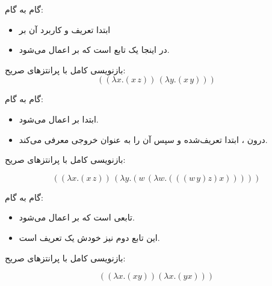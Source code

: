 \documentclass[11pt, a4paper, oneside]{article}
\newcounter{itemadded}
\let\LaTeXStandardEnumerateBegin\enumerate
\let\LaTeXStandardEnumerateEnd\endenumerate
\renewenvironment{enumerate}{%
	\LaTeXStandardEnumerateBegin%
	\setcounter{itemadded}{0}
}{%
	\LaTeXStandardEnumerateEnd%
}%
\begin{document}
		\begin{enumerate}
			
			\item {} \par
			
			گام به گام:
			
			\begin{itemize}
				
				\item ابتدا تعریف  و کاربرد آن بر 
				
				\item در اینجا  یک تابع است که بر  اعمال می‌شود.
				
			\end{itemize}
			
			بازنویسی کامل با پرانتزهای صریح:
			\[
			\left( \left( \lambda x . (x \, z) \right) \, \left( \lambda y . (x \, y) \right) \right)
			\]
			
			\item {} \par
			
			گام به گام:
			
			\begin{itemize}
				
				\item ابتدا  بر  اعمال می‌شود.
				
				\item درون ، ابتدا  تعریف‌شده و سپس  آن را به عنوان خروجی  معرفی می‌کند.
				
			\end{itemize}
			
			بازنویسی کامل با پرانتزهای صریح:
			
			\[
			\left( \left( \lambda x . (x \, z) \right) \, \left( \lambda y . \left( w \, \left( \lambda w . \left( \left( \left( w \, y \right) z \right) x \right) \right) \right) \right) \right)
			\]
			
			\item {} \par
			
			گام به گام:
			
			\begin{itemize}
				
				\item {} تابعی است که بر  اعمال می‌شود.
				
				\item این تابع دوم  نیز خودش یک تعریف \lr{$\lambda$} است.
				
			\end{itemize}
			
			بازنویسی کامل با پرانتزهای صریح:
			
			\[
			((\lambda x.(xy))(\lambda x.(yx)))
			\]
			
			
			
		\end{enumerate}
		
\end{document}
